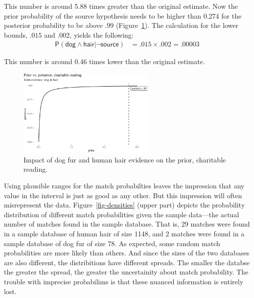 \documentclass[
  letterpaper,
  DIV=11,
  numbers=noendperiod]{scrartcl}
\newcommand{\s}[1]{\mbox{$\mathsf{#1}$}}
\begin{document}
This number is around 5.88 times greater than the original estimate. Now
the prior probability of the source hypothesis needs to be higher than
0.274 for the posterior probability to be above .99
(Figure~\ref{fig-impactofcharitable}). The calculation for the lower
bounds, \(.015\) and \(.002\), yields the following: \begin{align*}
\mathsf{P}(\s{dog}\wedge \s{hair} \vert \neg \s{source})   & =  .015 \times .002 =.00003
\end{align*}

\noindent   This number is around 0.46 times lower than the original
estimate.

\begin{figure}[H]

{\centering \includegraphics[width=0.6\textwidth,height=\textheight]{imp_philosophical_backup_files/figure-pdf/fig-impactofcharitable-1.pdf}

}

\caption{\label{fig-impactofcharitable}Impact of dog fur and human hair
evidence on the prior, charitable reading.}

\end{figure}

Using plausible ranges for the match probabilties leaves the impression
that any value in the interval is just as good as any other. But this
impression will often misrepresent the data. Figure~\ref{fig-densities}
(upper part) depicts the probability distribution of different match
probabilities given the sample data---the actual number of matches found
in the sample database. That is, 29 matches were found in a sample
database of human hair of size 1148, and 2 matches were found in a
sample database of dog fur of size 78. As expected, some random match
probabilities are more likely than others. And since the sizes of the
two databases are also different, the distribitions have different
spreads. The smaller the databse the greater the spread, the greater the
uncertainity about match probability. The trouble with imprecise
probabilims is that these nuanced information is entirely lost.
\end{document}
